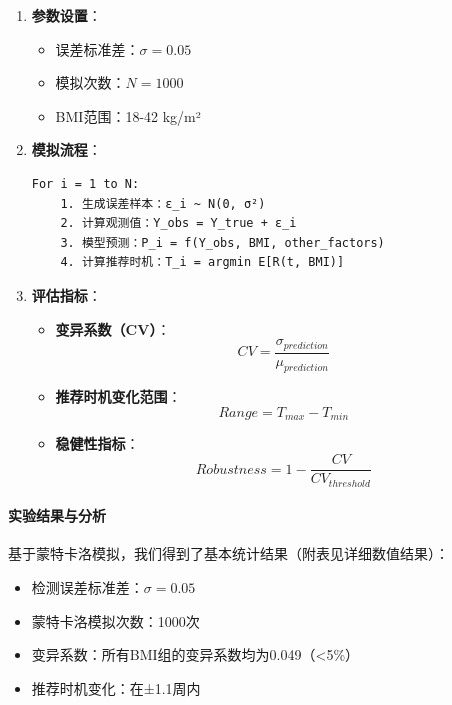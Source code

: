\documentclass[12pt,a4paper]{ctexart}
\numberwithin{equation}{section}
\theoremstyle{mcm}
\begin{document}
\begin{enumerate}
    \item \textbf{参数设置}：
    \begin{itemize}
        \item 误差标准差：$\sigma = 0.05$
        \item 模拟次数：$N = 1000$
        \item BMI范围：18-42 kg/m²
    \end{itemize}
    
    \item \textbf{模拟流程}：
    \begin{lstlisting}[caption=蒙特卡洛模拟算法]
For i = 1 to N:
    1. 生成误差样本：ε_i ~ N(0, σ²)
    2. 计算观测值：Y_obs = Y_true + ε_i
    3. 模型预测：P_i = f(Y_obs, BMI, other_factors)
    4. 计算推荐时机：T_i = argmin E[R(t, BMI)]
    \end{lstlisting}

    \item \textbf{评估指标}：
    \begin{itemize}
        \item \textbf{变异系数（CV）}：
        \begin{equation}
        CV = \frac{\sigma_{prediction}}{\mu_{prediction}}
        \end{equation}
    
        \item \textbf{推荐时机变化范围}：
        \begin{equation}
        Range = T_{max} - T_{min}
        \end{equation}
    
        \item \textbf{稳健性指标}：
        \begin{equation}
        Robustness = 1 - \frac{CV}{CV_{threshold}}
        \end{equation}
        \end{itemize}
\end{enumerate}

\paragraph{实验结果与分析}

基于蒙特卡洛模拟，我们得到了基本统计结果（附表见详细数值结果）：
\begin{itemize}
    \item 检测误差标准差：$\sigma = 0.05$
    \item 蒙特卡洛模拟次数：1000次
    \item 变异系数：所有BMI组的变异系数均为0.049（<5\%）
    \item 推荐时机变化：在±1.1周内
\end{itemize}
\end{document}
